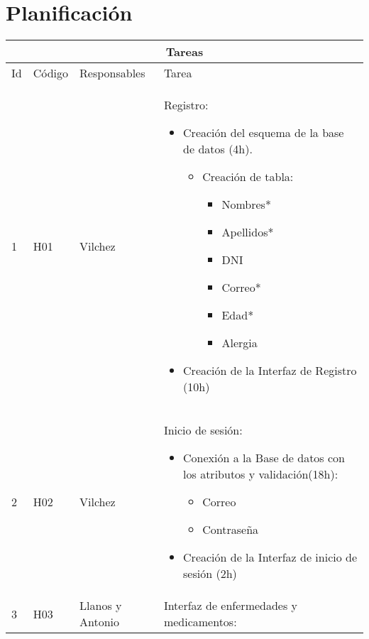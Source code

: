 \chapter{Planificación}

\begin{table}[htb]
\centering
\begin{tabular}{|l|p{1.5cm}|p{2.5cm}|p{10cm}|}
	\hline
	\multicolumn{4}{|c|}{Tareas} \\ \hline
	Id & Código & Responsables & Tarea \\
	\hline \hline
	1 & H01 & Vilchez & Registro:\begin{itemize}
		\item Creación del esquema de la base de datos (4h).
			\begin{itemize}
			\item Creación de tabla:
			 		\begin{itemize}
			 		\item Nombres*
			 		\item Apellidos*
			 		\item DNI
			 		\item Correo*
			 		\item Edad*
			 		\item Alergia		 	 
			 	\end{itemize}
			\end{itemize}
		\item Creación de la Interfaz de Registro (10h)
		
		
	\end{itemize}\\ \hline
	
	2 & H02 & Vilchez & Inicio de sesión: \begin{itemize}
		\item Conexión a la Base de datos con los atributos y validación(18h):							
			\begin{itemize}						
				\item Correo
				\item Contraseña	 	 				
			\end{itemize}
		
		\item Creación de la Interfaz de inicio de sesión (2h) 
		\end{itemize}\\ \hline
	
	3 & H03 & Llanos y Antonio & Interfaz de enfermedades y medicamentos: 


\end{tabular}
\end{table}
